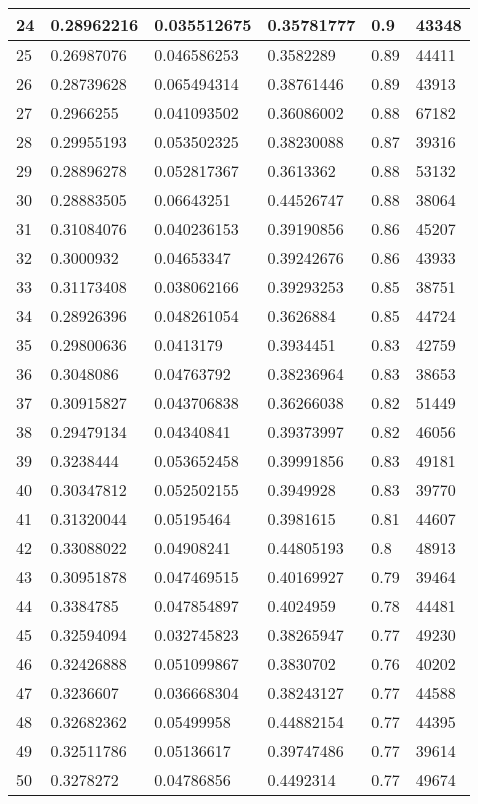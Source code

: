 \begin{longtable}{|l|l|l|l|l|l|}
24 & 0.28962216 & 0.035512675 & 0.35781777 & 0.9 & 43348 \\ \hline 
25 & 0.26987076 & 0.046586253 & 0.3582289 & 0.89 & 44411 \\ \hline 
26 & 0.28739628 & 0.065494314 & 0.38761446 & 0.89 & 43913 \\ \hline 
27 & 0.2966255 & 0.041093502 & 0.36086002 & 0.88 & 67182 \\ \hline 
28 & 0.29955193 & 0.053502325 & 0.38230088 & 0.87 & 39316 \\ \hline 
29 & 0.28896278 & 0.052817367 & 0.3613362 & 0.88 & 53132 \\ \hline 
30 & 0.28883505 & 0.06643251 & 0.44526747 & 0.88 & 38064 \\ \hline 
31 & 0.31084076 & 0.040236153 & 0.39190856 & 0.86 & 45207 \\ \hline 
32 & 0.3000932 & 0.04653347 & 0.39242676 & 0.86 & 43933 \\ \hline 
33 & 0.31173408 & 0.038062166 & 0.39293253 & 0.85 & 38751 \\ \hline 
34 & 0.28926396 & 0.048261054 & 0.3626884 & 0.85 & 44724 \\ \hline 
35 & 0.29800636 & 0.0413179 & 0.3934451 & 0.83 & 42759 \\ \hline 
36 & 0.3048086 & 0.04763792 & 0.38236964 & 0.83 & 38653 \\ \hline 
37 & 0.30915827 & 0.043706838 & 0.36266038 & 0.82 & 51449 \\ \hline 
38 & 0.29479134 & 0.04340841 & 0.39373997 & 0.82 & 46056 \\ \hline 
39 & 0.3238444 & 0.053652458 & 0.39991856 & 0.83 & 49181 \\ \hline 
40 & 0.30347812 & 0.052502155 & 0.3949928 & 0.83 & 39770 \\ \hline 
41 & 0.31320044 & 0.05195464 & 0.3981615 & 0.81 & 44607 \\ \hline 
42 & 0.33088022 & 0.04908241 & 0.44805193 & 0.8 & 48913 \\ \hline 
43 & 0.30951878 & 0.047469515 & 0.40169927 & 0.79 & 39464 \\ \hline 
44 & 0.3384785 & 0.047854897 & 0.4024959 & 0.78 & 44481 \\ \hline 
45 & 0.32594094 & 0.032745823 & 0.38265947 & 0.77 & 49230 \\ \hline 
46 & 0.32426888 & 0.051099867 & 0.3830702 & 0.76 & 40202 \\ \hline 
47 & 0.3236607 & 0.036668304 & 0.38243127 & 0.77 & 44588 \\ \hline 
48 & 0.32682362 & 0.05499958 & 0.44882154 & 0.77 & 44395 \\ \hline 
49 & 0.32511786 & 0.05136617 & 0.39747486 & 0.77 & 39614 \\ \hline 
50 & 0.3278272 & 0.04786856 & 0.4492314 & 0.77 & 49674 \\ \hline 
\end{longtable}